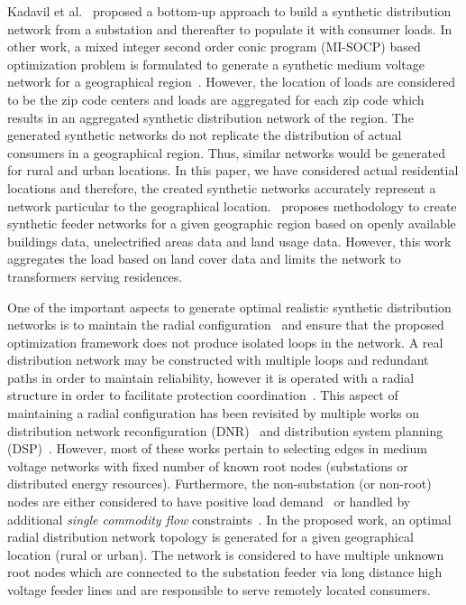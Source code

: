 \documentclass[sigconf]{acmart}
\begin{document}
Kadavil et al.~\cite{gm2016} proposed a bottom-up approach to build a synthetic distribution network from a substation and thereafter to populate it with consumer loads. In other work, a mixed integer second order conic program (MI-SOCP) based optimization problem is formulated to generate a synthetic medium voltage network for a geographical region~\cite{trpovski_2018}. However, the location of loads are considered to be the zip code centers and loads are aggregated for each zip code which results in an aggregated synthetic distribution network of the region. The generated synthetic networks do not replicate the distribution of actual consumers in a geographical region. Thus, similar networks would be generated for rural and urban locations. In this paper, we have considered actual residential locations and therefore, the created synthetic networks accurately represent a network particular to the geographical location.~\cite{pisano} proposes methodology to create synthetic feeder networks for a given geographic region based on openly available buildings data, unelectrified areas data and land usage data. However, this work aggregates the load based on land cover data and limits the network to transformers serving residences.  

One of the important aspects to generate optimal realistic synthetic distribution networks is to maintain the radial configuration~\cite{lei2019radiality} and ensure that the proposed optimization framework does not produce isolated loops in the network. A real distribution network may be constructed with multiple loops and redundant paths in order to maintain reliability, however it is operated with a radial structure in order to facilitate protection coordination~\cite{rad_prot}. This aspect of maintaining a radial configuration has been revisited by multiple works on distribution network reconfiguration (DNR)~\cite{manish2018OptimalDS,manish2019,dist_recon_2012} and distribution system planning (DSP)~\cite{radiality_2012,radiality_1987,wang2019radial}. However, most of these works pertain to selecting edges in medium voltage networks with fixed number of known root nodes (substations or distributed energy resources). Furthermore, the non-substation (or non-root) nodes are either considered to have positive load demand~\cite{dist_recon_2012,radiality_2012,radiality_1987} or handled by additional \emph{single commodity flow} constraints~\cite{manish2019,wang2019radial}. In the proposed work, an optimal radial distribution network topology is generated for a given geographical location (rural or urban). The network is considered to have multiple unknown root nodes which are connected to the substation feeder via long distance high voltage feeder lines and are responsible to serve remotely located consumers.
\end{document}
